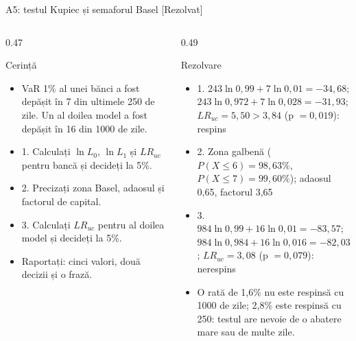 \begin{frame}{A5: testul Kupiec și semaforul Basel [Rezolvat]}
\itemsize{\scriptsize}
\begin{columns}[T]
\begin{column}{0.47\textwidth}
\begin{block}{Cerință}
\begin{itemize}
    \item VaR 1\% al unei bănci a fost depășit în 7 din ultimele 250 de zile. Un al doilea model a fost depășit în 16 din 1000 de zile.
    \item 1. Calculați $\ln L_0$, $\ln L_1$ și $LR_{uc}$ pentru bancă și decideți la 5\%.
    \item 2. Precizați zona Basel, adaosul și factorul de capital.
    \item 3. Calculați $LR_{uc}$ pentru al doilea model și decideți la 5\%.
    \item Raportați: cinci valori, două decizii și o frază.
\end{itemize}
\end{block}
\end{column}
\begin{column}{0.49\textwidth}
\begin{exampleblock}{Rezolvare}
\begin{itemize}
    \item 1. $243\ln 0{,}99 + 7\ln 0{,}01 = -34{,}68$; $243\ln 0{,}972 + 7\ln 0{,}028 = -31{,}93$; $LR_{uc} = 5{,}50 > 3{,}84$ (p $= 0{,}019$): respins
    \item 2. Zona galbenă ($P(X \le 6) = 98{,}63\%$, $P(X \le 7) = 99{,}60\%$); adaosul 0,65, factorul 3,65
    \item 3. $984\ln 0{,}99 + 16\ln 0{,}01 = -83{,}57$; $984\ln 0{,}984 + 16\ln 0{,}016 = -82{,}03$; $LR_{uc} = 3{,}08$ (p $= 0{,}079$): nerespins
    \item O rată de 1,6\% nu este respinsă cu 1000 de zile; 2,8\% este respinsă cu 250: testul are nevoie de o abatere mare sau de multe zile.
\end{itemize}
\end{exampleblock}
\end{column}
\end{columns}
\end{frame}

